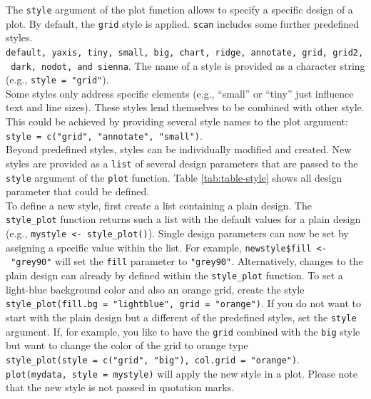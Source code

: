 \documentclass[
]{book}
\begin{document}
The \texttt{style} argument of the plot function allows to specify a specific design of a plot. By default, the \texttt{grid} style is applied. \texttt{scan} includes some further predefined styles. \texttt{default,\ yaxis,\ tiny,\ small,\ big,\ chart,\ ridge,\ annotate,\ grid,\ grid2,\ dark,\ nodot,\ and\ sienna}. The name of a style is provided as a character string (e.g., \texttt{style\ =\ "grid"}).\\
Some styles only address specific elements (e.g., ``small'' or ``tiny'' just influence text and line sizes). These styles lend themselves to be combined with other style. This could be achieved by providing several style names to the plot argument: \texttt{style\ =\ c("grid",\ "annotate",\ "small")}.\\
Beyond predefined styles, styles can be individually modified and created. New styles are provided as a \texttt{list} of several design parameters that are passed to the \texttt{style} argument of the \texttt{plot} function. Table \ref{tab:table-style} shows all design parameter that could be defined.\\
To define a new style, first create a list containing a plain design. The \texttt{style\_plot} function returns such a list with the default values for a plain design (e.g., \texttt{mystyle\ \textless{}-\ style\_plot()}). Single design parameters can now be set by assigning a specific value within the list. For example, \texttt{newstyle\$fill\ \textless{}-\ "grey90"} will set the \texttt{fill} parameter to \texttt{"grey90"}. Alternatively, changes to the plain design can already by defined within the \texttt{style\_plot} function. To set a light-blue background color and also an orange grid, create the style \texttt{style\_plot(fill.bg\ =\ "lightblue",\ grid\ =\ "orange")}.
If you do not want to start with the plain design but a different of the predefined styles, set the \texttt{style} argument. If, for example, you like to have the \texttt{grid} combined with the \texttt{big} style but want to change the color of the grid to orange type \texttt{style\_plot(style\ =\ c("grid",\ "big"),\ col.grid\ =\ "orange")}. \texttt{plot(mydata,\ style\ =\ mystyle)} will apply the new style in a plot. Please note that the new style is not passed in quotation marks.
\end{document}
